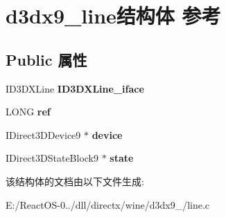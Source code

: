 \hypertarget{structd3dx9__line}{}\section{d3dx9\+\_\+line结构体 参考}
\label{structd3dx9__line}
\subsection*{Public 属性}
\begin{DoxyCompactItemize}
\item 
\mbox{\label{structd3dx9__line_a635b4719650bc1a91779ba18a744ad20}} 
I\+D3\+D\+X\+Line {\bfseries I\+D3\+D\+X\+Line\+\_\+iface}
\item 
\mbox{\label{structd3dx9__line_a151b169a8e5b5889d9654abfc61a94b6}} 
L\+O\+NG {\bfseries ref}
\item 
\mbox{\label{structd3dx9__line_ad103da9a4ba2be61690b45208b734546}} 
I\+Direct3\+D\+Device9 $\ast$ {\bfseries device}
\item 
\mbox{\label{structd3dx9__line_afdd111deffc9883f28752095467675c0}} 
I\+Direct3\+D\+State\+Block9 $\ast$ {\bfseries state}
\end{DoxyCompactItemize}


该结构体的文档由以下文件生成\+:\begin{DoxyCompactItemize}
\item 
E\+:/\+React\+O\+S-\/0../dll/directx/wine/d3dx9\+\_/line.\+c\end{DoxyCompactItemize}

